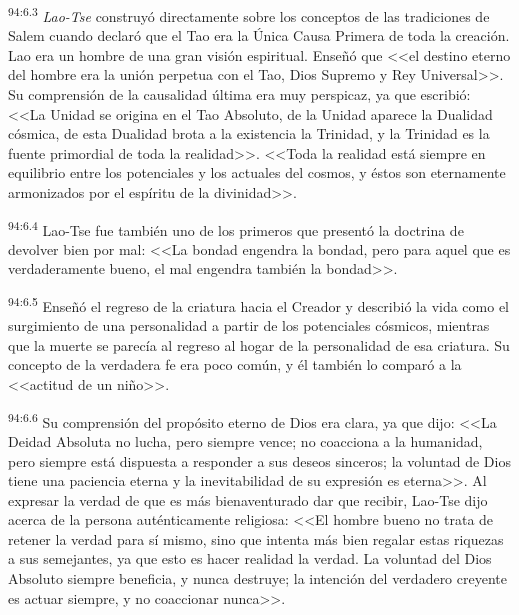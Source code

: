 \par
\textsuperscript{94:6.3} \textit{Lao-Tse} construyó directamente sobre los conceptos de las tradiciones de Salem cuando declaró que el Tao era la Única Causa Primera de toda la creación. Lao era un hombre de una gran visión espiritual. Enseñó que <<el destino eterno del hombre era la unión perpetua con el Tao, Dios Supremo y Rey Universal>>. Su comprensión de la causalidad última era muy perspicaz, ya que escribió: <<La Unidad se origina en el Tao Absoluto, de la Unidad aparece la Dualidad cósmica, de esta Dualidad brota a la existencia la Trinidad, y la Trinidad es la fuente primordial de toda la realidad>>. <<Toda la realidad está siempre en equilibrio entre los potenciales y los actuales del cosmos, y éstos son eternamente armonizados por el espíritu de la divinidad>>.

\par
\textsuperscript{94:6.4} Lao-Tse fue también uno de los primeros que presentó la doctrina de devolver bien por mal: <<La bondad engendra la bondad, pero para aquel que es verdaderamente bueno, el mal engendra también la bondad>>.

\par
\textsuperscript{94:6.5} Enseñó el regreso de la criatura hacia el Creador y describió la vida como el surgimiento de una personalidad a partir de los potenciales cósmicos, mientras que la muerte se parecía al regreso al hogar de la personalidad de esa criatura. Su concepto de la verdadera fe era poco común, y él también lo comparó a la <<actitud de un niño>>.

\par
\textsuperscript{94:6.6} Su comprensión del propósito eterno de Dios era clara, ya que dijo: <<La Deidad Absoluta no lucha, pero siempre vence; no coacciona a la humanidad, pero siempre está dispuesta a responder a sus deseos sinceros; la voluntad de Dios tiene una paciencia eterna y la inevitabilidad de su expresión es eterna>>. Al expresar la verdad de que es más bienaventurado dar que recibir, Lao-Tse dijo acerca de la persona auténticamente religiosa: <<El hombre bueno no trata de retener la verdad para sí mismo, sino que intenta más bien regalar estas riquezas a sus semejantes, ya que esto es hacer realidad la verdad. La voluntad del Dios Absoluto siempre beneficia, y nunca destruye; la intención del verdadero creyente es actuar siempre, y no coaccionar nunca>>.

